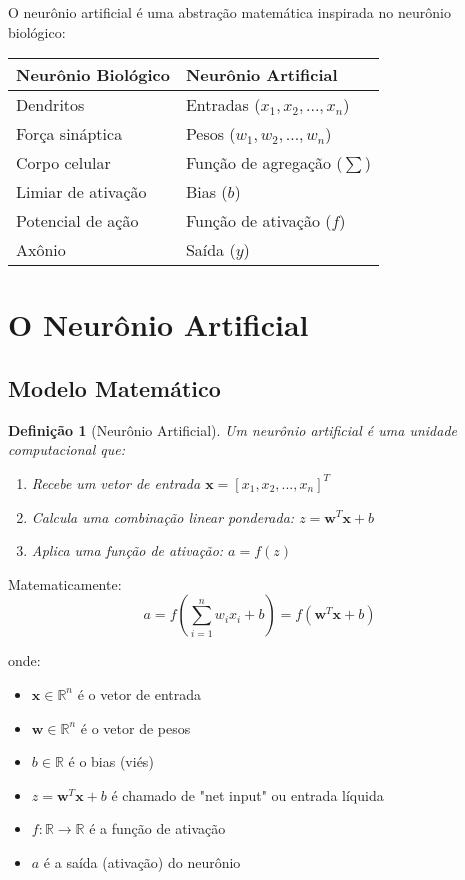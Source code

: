 \documentclass[a4paper,12pt]{article}
\newtheorem{definicao}{Definição}[section]
\begin{document}
O neurônio artificial é uma abstração matemática inspirada no neurônio biológico:

\begin{center}
\begin{tabular}{ll}
\textbf{Neurônio Biológico} & \textbf{Neurônio Artificial} \\
\hline
Dendritos & Entradas ($x_1, x_2, ..., x_n$) \\
Força sináptica & Pesos ($w_1, w_2, ..., w_n$) \\
Corpo celular & Função de agregação ($\sum$) \\
Limiar de ativação & Bias ($b$) \\
Potencial de ação & Função de ativação ($f$) \\
Axônio & Saída ($y$) \\
\end{tabular}
\end{center}

\section{O Neurônio Artificial}

\subsection{Modelo Matemático}

\begin{definicao}[Neurônio Artificial]
Um neurônio artificial é uma unidade computacional que:
\begin{enumerate}
    \item Recebe um vetor de entrada $\mathbf{x} = [x_1, x_2, ..., x_n]^T$
    \item Calcula uma combinação linear ponderada: $z = \mathbf{w}^T\mathbf{x} + b$
    \item Aplica uma função de ativação: $a = f(z)$
\end{enumerate}
\end{definicao}

Matematicamente:
\begin{equation}
    a = f\left(\sum_{i=1}^{n} w_i x_i + b\right) = f(\mathbf{w}^T\mathbf{x} + b)
    \label{eq:neuron}
\end{equation}

onde:
\begin{itemize}
    \item $\mathbf{x} \in \mathbb{R}^n$ é o vetor de entrada
    \item $\mathbf{w} \in \mathbb{R}^n$ é o vetor de pesos
    \item $b \in \mathbb{R}$ é o bias (viés)
    \item $z = \mathbf{w}^T\mathbf{x} + b$ é chamado de "net input" ou entrada líquida
    \item $f: \mathbb{R} \rightarrow \mathbb{R}$ é a função de ativação
    \item $a$ é a saída (ativação) do neurônio
\end{itemize}
\end{document}
